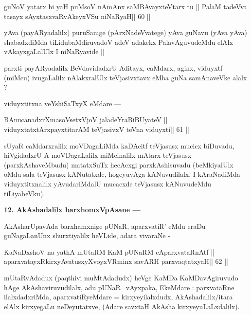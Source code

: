 \begin{shl}
guNoV yatarx hi yaH puMsoV nAmAnx saMBAvayxteV\s tarx tu ||
PalaM tadeVva tasayx sAyxtasxvaRvAkeyxVSu niNaRyaH\hfill || 60 ||
\end{shl}

\begin{artha}
yAva (payARyadalilx) puruSanige (pArxNadeVvatege) yAva guNavu (yAva yAva) shabadxdiMda tiLidubaMdiruvadoV adeV adakekx PalavAguvudeMdu elAlx vAkayxgaLalUlx I niNaRyavide ||
\end{artha}

\begin{artha}
parxti payARyadalilx BeVdavidadxrU Aditayx, caMdarx, aginx, viduyxtf (miMcu) ivugaLalilx nAlakxralUlx teVjasivxtavx eMba guNa samAnaveVke alalx ?
\end{artha}

\begin{artha}
viduyxtitxna veYshiSaTxyX eMdare --- 
\end{artha} 

\begin{shl}
BAnucanadxrXmasoVsetxVjoV jaladeYraBiBUyateV ||
viduyxtatxtArxpayxtitarAM teVjasivxV teVna viduyxti\hfill || 61 ||
\end{shl}

\begin{artha}
sUyaR caMdarxralilx moVDagaLiMda kaDAcitf teVjasusx mucicx biDuvadu, hiVgidadxrU A moVDagaLalilx miMcinalilx mAtarx teVjasusx (parxkAshaveMbudu) matatxSuTx hecAcxgi parxkAshisuvadu (beMkiyalUlx oMdu sala teVjasusx kANutatxde, hogeyuvAga kANuvudilalx. I kAraNadiMda viduyxtitxnalilx yAvudariMdalU mucacxde teVjasusx kANuvudeMdu tiLiyabeVku).
\end{artha}

\begin{artha}
{\bf 12. AkAshadalilx barxhomxVpAsane ---}
\end{artha}

\begin{artha}
AkAsharUpavAda barxhamxnige pUNaR, aparxvatiR' eMdu eraDu guNagaLanUnx shurxtiyalilx heVLide, adara vivaraNe - 
\end{artha}

\begin{shl}
KaNaDxshoV na yathA mUtaRM KaM pUNaRM cAparxvataRnAtf ||
aparxvatayxRkirxyAvatusxyXvoyxVRminx savARH parxvaqtatxyaH\hfill || 62 ||
\end{shl}

\begin{artha}
mUtaRvAdadux (paqthivi muMtAdadudx) heVge KaMDa KaMDavAgiruvudo hAge AkAshaviruvudilalx, adu pUNaR=vAyxpaka, EkeMdare : parxvataRne ilalxdadxriMda, aparxvatiRyeMdare = kirxyeyilalxdudx, AkAshadalilx/itara elAlx kirxyegaLu neDeyutatxve, (Adare savxtaH AkAsha kirxyeyuLaLxdalilx).
\end{artha}

